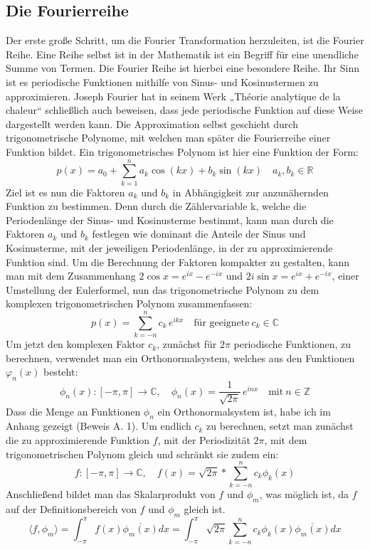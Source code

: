 \documentclass[a4paper,12pt]{article}
\theoremstyle{definition}
\theoremstyle{remark}
\begin{document}
\subsection{Die Fourierreihe}
Der erste große Schritt, um die Fourier Transformation herzuleiten, ist die Fourier Reihe. 
Eine Reihe selbst ist in der Mathematik ist ein Begriff für eine unendliche Summe von Termen. 
Die Fourier Reihe ist hierbei eine besondere Reihe. Ihr Sinn ist es periodische Funktionen 
mithilfe von Sinus- und Kosinustermen zu approximieren.  Joseph Fourier hat in seinem Werk 
„Théorie analytique de la chaleur“ schließlich auch beweisen, dass jede periodische Funktion 
auf diese Weise dargestellt werden kann. Die Approximation selbst geschieht durch 
trigonometrische Polynome, mit welchen man später die Fourierreihe einer Funktion bildet. 
Ein trigonometrisches Polynom ist hier eine Funktion der Form: 
$$p(x) = a_0 + \sum_{k=1}^n{a_k \cos(kx) + b_k \sin(kx)}  \quad a_k,b_k \in \mathbb{R}$$
Ziel ist es nun die Faktoren $a_k$ und $b_k$ in Abhängigkeit zur anzunähernden Funktion zu 
bestimmen. Denn durch die Zählervariable k, welche die Periodenlänge der Sinus- und 
Kosinusterme bestimmt, kann man durch die Faktoren $a_k$ und $b_k$ festlegen wie dominant 
die Anteile der Sinus und Kosinusterme, mit der jeweiligen Periodenlänge, in der zu 
approximierende Funktion sind. Um die Berechnung der Faktoren kompakter zu gestalten, 
kann man mit dem Zusammenhang $2\cos{x} = e^{ix} -e^{-ix}$ und $2i\sin{x} = e^{ix}+e^{-ix}$, 
einer Umstellung der Eulerformel, nun das trigonometrische Polynom zu dem komplexen 
trigonometrischen Polynom zusammenfassen: 
$$p(x) = \sum_{k=-n}^n{c_k \, e^{ikx}} \quad \text{für geeignete} \: c_k \in \mathbb{C}$$
Um jetzt den komplexen Faktor $c_k$, zunächst für $2\pi$ periodische Funktionen, 
zu berechnen, verwendet man ein Orthonormalsystem, welches aus den Funktionen $\varphi_n(x)$ besteht:
$$\phi_n(x):[-\pi,\pi] \to \mathbb{C}, \quad \phi_n(x) = \frac{1}{\sqrt{2\pi}} \, e^{inx} \quad \text{mit} \: n\in \mathbb{Z}$$
Dass die Menge an Funktionen $\phi_n$ ein Orthonormalsystem ist, habe 
ich im Anhang gezeigt (Beweis A. 1). Um endlich $c_k$ zu berechnen, setzt man zunächst 
die zu approximierende Funktion $f$, mit der Periodizität $2\pi$, mit dem 
trigonometrischen Polynom gleich und schränkt sie zudem ein: 
$$f:[-\pi,\pi]\to \mathbb{C},\quad f(x) = \sqrt{2\pi} * \sum_{k = -n}^n{c_k\phi_k(x)} $$
Anschließend bildet man das Skalarprodukt von $f$ und $\phi_m$, was möglich ist, da 
$f$ auf der Definitionsbereich von $f$ und $\phi_m$ gleich ist. 
$$\langle f, \phi_m \rangle = \int_{-\pi}^\pi {f(x) \overline{\phi_m(x)}dx} = \int_{-\pi}^\pi{\sqrt{2\pi}\sum_{k = -n}^n{c_k\phi_k(x)\overline{\phi_m(x)}}dx}$$
\end{document}
